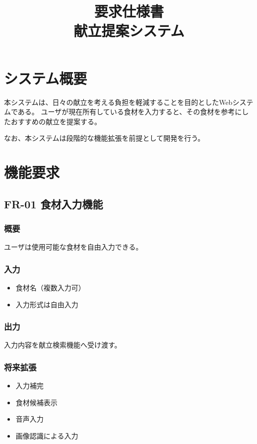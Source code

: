 \documentclass[a4paper,12pt]{jarticle}
\title{要求仕様書\\献立提案システム}
\author{}
\date{}
\begin{document}
\maketitle

\section{システム概要}

本システムは、日々の献立を考える負担を軽減することを目的としたWebシステムである。
ユーザが現在所有している食材を入力すると、その食材を参考にしたおすすめの献立を提案する。

なお、本システムは段階的な機能拡張を前提として開発を行う。

\section{機能要求}

\subsection{FR-01 食材入力機能}

\subsubsection*{概要}
ユーザは使用可能な食材を自由入力できる。

\subsubsection*{入力}
\begin{itemize}
    \item 食材名（複数入力可）
    \item 入力形式は自由入力
\end{itemize}

\subsubsection*{出力}
入力内容を献立検索機能へ受け渡す。

\subsubsection*{将来拡張}
\begin{itemize}
    \item 入力補完
    \item 食材候補表示
    \item 音声入力
    \item 画像認識による入力
\end{itemize}
\end{document}
